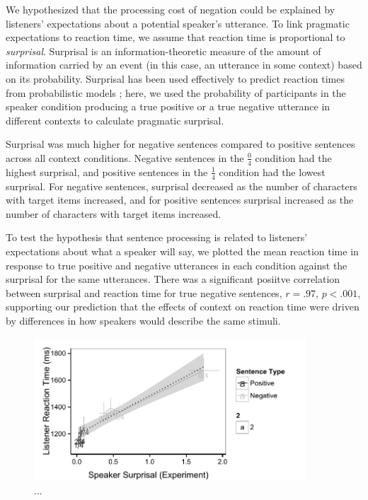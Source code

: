 \documentclass[man, noapacite]{apa2}
\begin{document}
We hypothesized that the processing cost of negation could be explained by listeners' expectations about a potential speaker's utterance.  To link pragmatic expectations to reaction time, we assume that reaction time is proportional to \emph{surprisal}. Surprisal is an information-theoretic measure of the amount of information carried by an event (in this case, an utterance in some context) based on its probability. Surprisal has been used effectively to predict reaction times from probabilistic models \cite{levy2008}; here, we used the probability of participants in the speaker condition producing a true positive or a true negative utterance in different contexts to calculate pragmatic surprisal.

Surprisal was much higher for negative sentences compared to positive sentences across all context conditions.  Negative sentences in the $\frac{0}{4}$ condition had the highest surprisal, and positive sentences in the $\frac{1}{4}$ condition had the lowest surprisal.  For negative sentences, surprisal decreased as the number of characters with target items increased, and for positive sentences surprisal increased as the number of characters with target items increased.  

To test the hypothesis that sentence processing is related to listeners' expectations about what a speaker will say, we plotted the mean reaction time in response to true positive and negative utterances in each condition against the surprisal for the same utterances.  There was a significant posiitve correlation between surprisal and reaction time for true negative sentences, $r=.97$, $p<.001$, supporting our prediction that the effects of context on reaction time were driven by differences in how speakers would describe the same stimuli.  


\begin{figure}[t]
\begin{center} 
\includegraphics[width=4in]{figures/production_rts.pdf}
\caption{\label{fig:scatter} ... }
\end{center} 
\end{figure}
\end{document}
